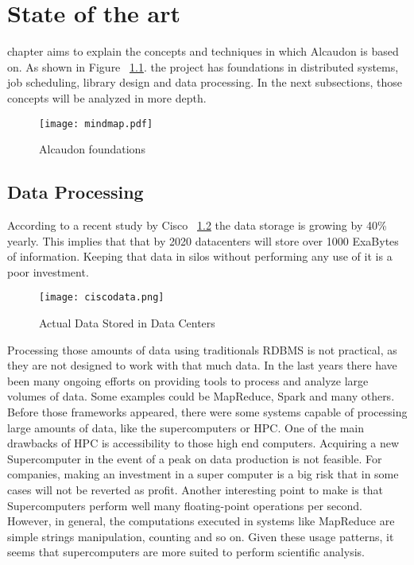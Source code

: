 \chapter{State of the art}
\label{chap:stateoftheart}

 chapter aims to explain the concepts and techniques in which
Alcaudon is based on. As shown in Figure ~\ref{fig:mindmap}. the project has foundations in
distributed systems, job scheduling, library design and data processing. In the
next subsections, those concepts will be analyzed in more depth.

\begin{figure}[!h]
\begin{center}
\texttt{[image: mindmap.pdf]}
\caption{Alcaudon foundations}
\label{fig:mindmap}
\end{center}
\end{figure}

\section{Data Processing}

According to a recent study by Cisco \cite{ciscosurvey}~\ref{fig:ciscodata} the
data storage is growing by 40\% yearly. This implies that that by 2020
datacenters will store over 1000 ExaBytes of information. Keeping that data in
silos without performing any use of it is a poor investment.

\begin{figure}[!h]
\begin{center}
\texttt{[image: ciscodata.png]}
\caption{Actual Data Stored in Data Centers\cite{ciscosurvey}}
\label{fig:ciscodata}
\end{center}
\end{figure}

Processing those amounts of data using traditionals RDBMS is not practical, as they
are not designed to work with that much data. In the last years there have been
many ongoing efforts on providing tools to process and analyze large volumes of
data. Some examples could be MapReduce\cite{mapreduce}, Spark\cite{spark} and
many others. Before those frameworks appeared, there were some systems capable
of processing large amounts of data, like the supercomputers or HPC. One of the
main drawbacks of HPC is accessibility to those high end computers. Acquiring a
new Supercomputer in the event of a peak on data production is not feasible. For
companies, making an investment in a super computer is a big risk that in some
cases will not be reverted as profit. Another interesting point to make is that
Supercomputers perform well many floating-point operations per second. However,
in general, the computations executed in systems like MapReduce are simple
strings manipulation, counting and so on. Given these usage patterns, it seems
that supercomputers are more suited to perform scientific analysis.

